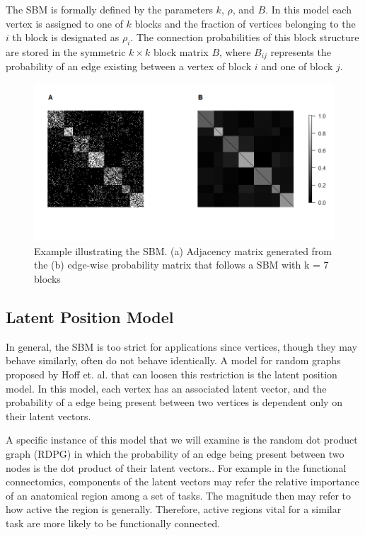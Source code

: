 The SBM is formally defined by the parameters $k$, $\rho$, and $B$. In this model each vertex is assigned to one of $k$ blocks and the fraction of vertices belonging to the $i$ th block is designated as $\rho_i$.  The connection probabilities of this block structure are stored in the symmetric $k\times k$ block matrix $B$, where $B_{ij}$ represents the probability of an edge existing between a vertex of block $i$ and one of block $j$.

\begin{figure}[!htb]
	\centering
	\includegraphics[width=16cm]{SBM_Example.png}
	\caption{Example illustrating the SBM. (a) Adjacency matrix generated from the (b) edge-wise probability matrix that follows a SBM with k = 7 blocks}
	\label{fig:plot1}
\end{figure}

\subsection{Latent Position Model}
In general, the SBM is too strict for applications since vertices, though they may behave similarly, often do not behave identically. A model for random graphs proposed by Hoff et. al. that can loosen this restriction is the latent position model.  In this model, each vertex has an associated latent vector, and the probability of a edge being present between two vertices is dependent only on their latent vectors. \cite{Hoff}  

A specific instance of this model that we will examine is the random dot product graph (RDPG) in which the probability of an edge being present between two nodes is the dot product of their latent vectors.\cite{Schein}.  For example in the functional connectomics, components of the latent vectors may refer the relative importance of an anatomical region among a set of tasks.  The magnitude then may refer to how active the region is generally.  Therefore, active regions vital for a similar task are more likely to be functionally connected.

